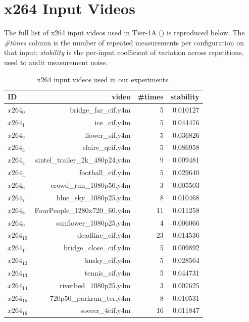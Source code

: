 \appendices

\section{x264 Input Videos}
\label{app:input-videos}

The full list of x264 input videos used in Tier-1A
() is reproduced below. The \emph{\#times} column
is the number of repeated measurements per configuration on that input;
\emph{stability} is the per-input coefficient of variation across
repetitions, used to audit measurement noise.

\begin{table}[h]
    \centering
    \footnotesize
    \begin{tabular}{lrrr}
        \toprule
            ID & video & \#times & stability \\
        \midrule
            $x264_{0}$ & bridge\_far\_cif.y4m & 5 & 0.010127 \\
            $x264_{1}$ & ice\_cif.y4m & 5 & 0.044476 \\
            $x264_{2}$ & flower\_sif.y4m & 5 & 0.036826 \\
            $x264_{3}$ & claire\_qcif.y4m & 5 & 0.086958 \\
            $x264_{4}$ & sintel\_trailer\_2k\_480p24.y4m & 9 & 0.009481 \\
            $x264_{5}$ & football\_cif.y4m & 5 & 0.029640 \\
            $x264_{6}$ & crowd\_run\_1080p50.y4m & 3 & 0.005503 \\
            $x264_{7}$ & blue\_sky\_1080p25.y4m & 8 & 0.010468 \\
            $x264_{8}$ & FourPeople\_1280x720\_60.y4m & 11 & 0.011258 \\
            $x264_{9}$ & sunflower\_1080p25.y4m & 4 & 0.006066 \\
            $x264_{10}$ & deadline\_cif.y4m & 23 & 0.014536 \\
            $x264_{11}$ & bridge\_close\_cif.y4m & 5 & 0.009892 \\
            $x264_{12}$ & husky\_cif.y4m & 5 & 0.028564 \\
            $x264_{13}$ & tennis\_sif.y4m & 5 & 0.044731 \\
            $x264_{14}$ & riverbed\_1080p25.y4m & 3 & 0.007625 \\
            $x264_{15}$ & 720p50\_parkrun\_ter.y4m & 8 & 0.010531 \\
            $x264_{16}$ & soccer\_4cif.y4m & 16 & 0.011847 \\
        \bottomrule
    \end{tabular}
    \caption{x264 input videos used in our experiments.}
    \label{tab:input_videos}
\end{table}

